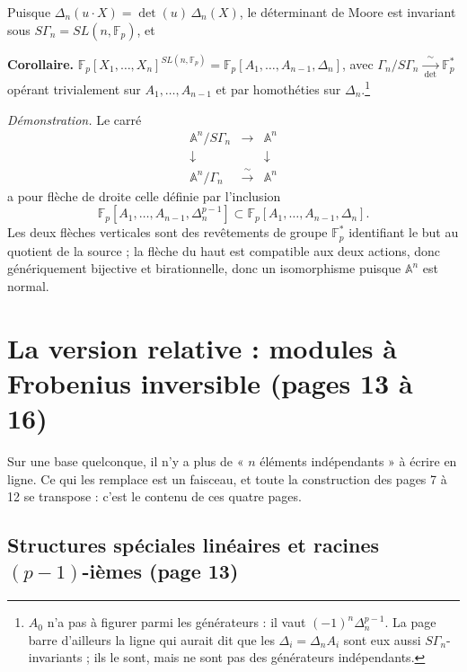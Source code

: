 \documentclass[11pt,a4paper]{article}
\begin{document}
Puisque $\Delta_n(u \cdot X) = \det(u)\, \Delta_n(X)$, le déterminant de
Moore est invariant sous $S\Gamma_n = SL(n, \mathbb{F}_p)$, et

\textbf{Corollaire.}
$\mathbb{F}_p[X_1, \dots, X_n]^{SL(n, \mathbb{F}_p)} =
\mathbb{F}_p[A_1, \dots, A_{n-1}, \Delta_n]$, avec
$\Gamma_n/S\Gamma_n \xrightarrow[\ \det\ ]{\ \sim\ } \mathbb{F}_p^*$ opérant
trivialement sur $A_1, \dots, A_{n-1}$ et par homothéties sur
$\Delta_n$.\footnote{$A_0$ n'a pas à figurer parmi les générateurs : il vaut
$(-1)^n \Delta_n^{p-1}$. La page barre d'ailleurs la ligne qui aurait dit que
les $\Delta_i = \Delta_n A_i$ sont eux aussi $S\Gamma_n$-invariants ; ils le
sont, mais ne sont pas des générateurs indépendants.}

\emph{Démonstration.} Le carré
\[
  \begin{array}{ccc}
    \mathbb{A}^n/S\Gamma_n & \longrightarrow & \mathbb{A}^n \\
    \downarrow & & \downarrow \\
    \mathbb{A}^n/\Gamma_n & \xrightarrow{\ \sim\ } & \mathbb{A}^n
  \end{array}
\]
a pour flèche de droite celle définie par l'inclusion
\[
  \mathbb{F}_p[A_1, \dots, A_{n-1}, \Delta_n^{p-1}] \subset
  \mathbb{F}_p[A_1, \dots, A_{n-1}, \Delta_n] .
\]
Les deux flèches verticales
sont des revêtements de groupe $\mathbb{F}_p^*$ identifiant le but au
quotient de la source ; la flèche du haut est compatible aux deux actions,
donc génériquement bijective et birationnelle, donc un isomorphisme puisque
$\mathbb{A}^n$ est normal.

\section*{La version relative : modules à Frobenius inversible (pages 13 à 16)}

Sur une base quelconque, il n'y a plus de « $n$ éléments indépendants » à
écrire en ligne. Ce qui les remplace est un faisceau, et toute la
construction des pages 7 à 12 se transpose : c'est le contenu de ces quatre
pages.

\subsection*{Structures spéciales linéaires et racines $(p-1)$-ièmes (page 13)}
\end{document}
